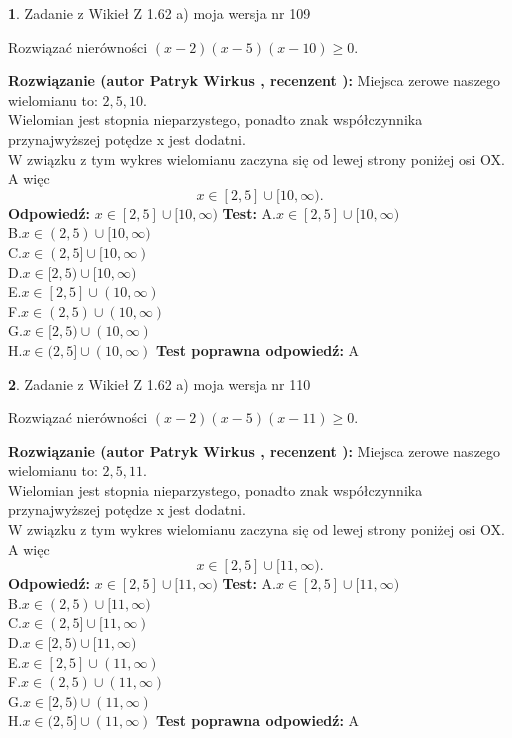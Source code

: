 \documentclass[12pt, a4paper]{article}
\theoremstyle{definition} %
\newtheorem{zad}{}
\newcommand{\zadStart}[1]{\begin{zad}#1\newline}
\newcommand{\zadStop}{\end{zad}}
\newcommand{\rozwStart}[2]{\noindent \textbf{Rozwiązanie (autor #1 , recenzent #2): }\newline}
\newcommand{\rozwStop}{\newline}
\newcommand{\odpStart}{\noindent \textbf{Odpowiedź:}\newline}
\newcommand{\odpStop}{\newline}
\newcommand{\testStart}{\noindent \textbf{Test:}\newline}
\newcommand{\testStop}{\newline}
\newcommand{\kluczStart}{\noindent \textbf{Test poprawna odpowiedź:}\newline}
\newcommand{\kluczStop}{\newline}
\begin{document}
\zadStart{Zadanie z Wikieł Z 1.62 a) moja wersja nr 109}

Rozwiązać nierówności $(x-2)(x-5)(x-10)\ge0$.
\zadStop
\rozwStart{Patryk Wirkus}{}
Miejsca zerowe naszego wielomianu to: $2, 5, 10$.\\
Wielomian jest stopnia nieparzystego, ponadto znak współczynnika przy\linebreak najwyższej potędze x jest dodatni.\\ W związku z tym wykres wielomianu zaczyna się od lewej strony poniżej osi OX. A więc $$x \in [2,5] \cup [10,\infty).$$
\rozwStop
\odpStart
$x \in [2,5] \cup [10,\infty)$
\odpStop
\testStart
A.$x \in [2,5] \cup [10,\infty)$\\
B.$x \in (2,5) \cup [10,\infty)$\\
C.$x \in (2,5] \cup [10,\infty)$\\
D.$x \in [2,5) \cup [10,\infty)$\\
E.$x \in [2,5] \cup (10,\infty)$\\
F.$x \in (2,5) \cup (10,\infty)$\\
G.$x \in [2,5) \cup (10,\infty)$\\
H.$x \in (2,5] \cup (10,\infty)$
\testStop
\kluczStart
A
\kluczStop



\zadStart{Zadanie z Wikieł Z 1.62 a) moja wersja nr 110}

Rozwiązać nierówności $(x-2)(x-5)(x-11)\ge0$.
\zadStop
\rozwStart{Patryk Wirkus}{}
Miejsca zerowe naszego wielomianu to: $2, 5, 11$.\\
Wielomian jest stopnia nieparzystego, ponadto znak współczynnika przy\linebreak najwyższej potędze x jest dodatni.\\ W związku z tym wykres wielomianu zaczyna się od lewej strony poniżej osi OX. A więc $$x \in [2,5] \cup [11,\infty).$$
\rozwStop
\odpStart
$x \in [2,5] \cup [11,\infty)$
\odpStop
\testStart
A.$x \in [2,5] \cup [11,\infty)$\\
B.$x \in (2,5) \cup [11,\infty)$\\
C.$x \in (2,5] \cup [11,\infty)$\\
D.$x \in [2,5) \cup [11,\infty)$\\
E.$x \in [2,5] \cup (11,\infty)$\\
F.$x \in (2,5) \cup (11,\infty)$\\
G.$x \in [2,5) \cup (11,\infty)$\\
H.$x \in (2,5] \cup (11,\infty)$
\testStop
\kluczStart
A
\kluczStop
\end{document}
